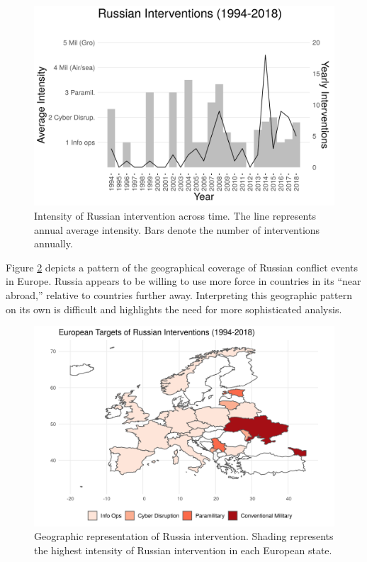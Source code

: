 \documentclass[11pt,letterpaper,pdftex,dvipsnames,table]{article}
\begin{document}
    \begin{figure}[H]
		\centering
		\includegraphics[width = \textwidth]{average_intensity_russian_aggression.png}
		\caption{Intensity of Russian intervention across time. The line represents annual average intensity. Bars denote the number of interventions annually.}
    \label{fig:intensity}
    \end{figure}

Figure \ref{fig:map} depicts a pattern of the geographical coverage of Russian conflict events in Europe. Russia appears to be willing to use more force in countries in its ``near abroad,'' relative to countries further away. Interpreting this geographic pattern on its own is difficult
and highlights the need for more sophisticated analysis.

	\begin{figure}[H]
		\centering
		\includegraphics[width = \textwidth]{map_aggregate_europe.png}
		\caption{Geographic representation of Russia intervention. Shading represents the highest intensity of Russian intervention in each European state.}
		\label{fig:map}
	\end{figure}
\end{document}
